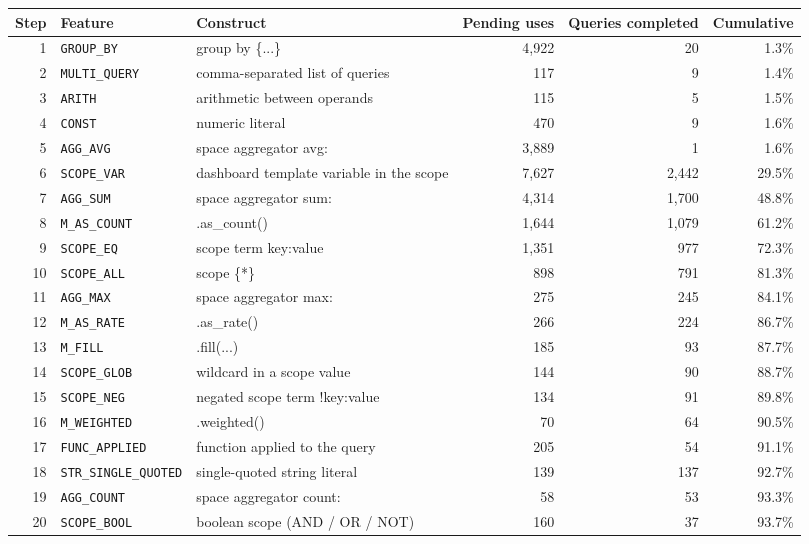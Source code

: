 \begin{tabular}{@{}rllrrr@{}}
\toprule
Step & Feature & Construct & Pending uses & Queries completed & Cumulative \\
\midrule
1 & \texttt{GROUP\_BY} & group by \{...\} & 4,922 & 20 & 1.3\% \\
2 & \texttt{MULTI\_QUERY} & comma-separated list of queries & 117 & 9 & 1.4\% \\
3 & \texttt{ARITH} & arithmetic between operands & 115 & 5 & 1.5\% \\
4 & \texttt{CONST} & numeric literal & 470 & 9 & 1.6\% \\
5 & \texttt{AGG\_AVG} & space aggregator avg: & 3,889 & 1 & 1.6\% \\
6 & \texttt{SCOPE\_VAR} & dashboard template variable in the scope & 7,627 & 2,442 & 29.5\% \\
7 & \texttt{AGG\_SUM} & space aggregator sum: & 4,314 & 1,700 & 48.8\% \\
8 & \texttt{M\_AS\_COUNT} & .as\_count() & 1,644 & 1,079 & 61.2\% \\
9 & \texttt{SCOPE\_EQ} & scope term key:value & 1,351 & 977 & 72.3\% \\
10 & \texttt{SCOPE\_ALL} & scope \{*\} & 898 & 791 & 81.3\% \\
11 & \texttt{AGG\_MAX} & space aggregator max: & 275 & 245 & 84.1\% \\
12 & \texttt{M\_AS\_RATE} & .as\_rate() & 266 & 224 & 86.7\% \\
13 & \texttt{M\_FILL} & .fill(...) & 185 & 93 & 87.7\% \\
14 & \texttt{SCOPE\_GLOB} & wildcard in a scope value & 144 & 90 & 88.7\% \\
15 & \texttt{SCOPE\_NEG} & negated scope term !key:value & 134 & 91 & 89.8\% \\
16 & \texttt{M\_WEIGHTED} & .weighted() & 70 & 64 & 90.5\% \\
17 & \texttt{FUNC\_APPLIED} & function applied to the query & 205 & 54 & 91.1\% \\
18 & \texttt{STR\_SINGLE\_QUOTED} & single-quoted string literal & 139 & 137 & 92.7\% \\
19 & \texttt{AGG\_COUNT} & space aggregator count: & 58 & 53 & 93.3\% \\
20 & \texttt{SCOPE\_BOOL} & boolean scope (AND / OR / NOT) & 160 & 37 & 93.7\% \\
\bottomrule
\end{tabular}
